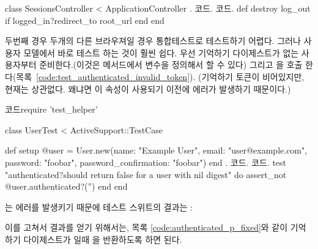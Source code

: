 {{\begin{codelisting}
\begin{code} class SessionsController < ApplicationController . 코드. 코드. def destroy log_out if logged_in?redirect_to root_url end end \end{code} \end{codelisting} 

두번째 경우 두개의 다른 브라우져일 경우 통합테스트로 테스트하기 어렵다. 그러나 사용자 모델에서 바로 테스트 하는 것이 훨씬 쉽다. 우선 기억하기 다이제스트가 없는 사용자부터 준비한다.(이것은 메서드에서  변수을 정의해서 할 수 있다) 그리고 을 호출 한다(목록~\ref{code:test_authenticated_invalid_token}). (기억하기 토큰이 비어있지만, 현재는 상관없다. 왜냐면 이 속성이 사용되기 이전에 에러가 발생하기 때문이다.) 

\begin{codelisting} \label{code:test_authenticated_invalid_token}  

\begin{code} 코드require 'test_helper' 

class UserTest < ActiveSupport::TestCase 

def setup @user = User.new(name: "Example User", email: "user@example.com", password: "foobar", password_confirmation: "foobar") end . 코드. 코드. test "authenticated?should return false for a user with nil digest" do assert_not @user.authenticated?('') end end \end{code} \end{codelisting} 

는 에러를 발생키기 때문에 테스트 스위트의 결과는 : 

\begin{codelisting}  

 \end{codelisting} 

이를 고쳐서 \passing 결과를 얻기 위해서는, 목록 \ref{code:authenticated_p_fixed}와 같이 기억하기 다이제스트가 일때 을 반환하도록 하면 된다. 

\begin{codelisting} \label{code:authenticated_p_fixed}  


\end{codelisting}}}
